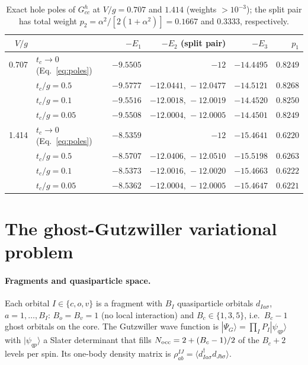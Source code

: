 \documentclass[11pt]{article}
\newcommand{\dg}{^{\dagger}}
\newcommand{\ket}[1]{|#1\rangle}
\newcommand{\braket}[1]{\langle #1\rangle}
\begin{document}
\begin{table}[h]
\centering
\small
\begin{tabular}{r l rrr r}
\toprule
$V/g$ & & $-E_1$ & $-E_2$ (split pair) & $-E_3$ & $p_1$\\
\midrule
0.707 & $t_c\to0$ (Eq.~\ref{eq:poles}) & $-9.5505$ & $-12$ & $-14.4495$ & $0.8249$\\
      & $t_c/g=0.5$  & $-9.5777$ & $-12.0441,\,-12.0477$ & $-14.5121$ & $0.8268$\\
      & $t_c/g=0.1$  & $-9.5516$ & $-12.0018,\,-12.0019$ & $-14.4520$ & $0.8250$\\
      & $t_c/g=0.05$ & $-9.5508$ & $-12.0004,\,-12.0005$ & $-14.4501$ & $0.8249$\\
\midrule
1.414 & $t_c\to0$ (Eq.~\ref{eq:poles}) & $-8.5359$ & $-12$ & $-15.4641$ & $0.6220$\\
      & $t_c/g=0.5$  & $-8.5707$ & $-12.0406,\,-12.0510$ & $-15.5198$ & $0.6263$\\
      & $t_c/g=0.1$  & $-8.5373$ & $-12.0016,\,-12.0020$ & $-15.4663$ & $0.6222$\\
      & $t_c/g=0.05$ & $-8.5362$ & $-12.0004,\,-12.0005$ & $-15.4647$ & $0.6221$\\
\bottomrule
\end{tabular}
\caption{Exact hole poles of $G^h_{cc}$ at $V/g=0.707$ and $1.414$ (weights $>10^{-3}$); the split pair has total weight $p_2=\alpha^2/[2(1+\alpha^2)]=0.1667$ and $0.3333$, respectively.}
\label{tab:EDpoles}
\end{table}

\section{The ghost-Gutzwiller variational problem}
\label{sec:gGut}

\paragraph{Fragments and quasiparticle space.} Each orbital $I\in\{c,o,v\}$ is a fragment with $B_I$ quasiparticle
orbitals $d_{Ia\sigma}$, $a=1,\dots,B_I$: $B_o=B_v=1$ (no local interaction) and $B_c\in\{1,3,5\}$, i.e.\ $B_c-1$ ghost orbitals on
the core. The Gutzwiller wave function is $\ket{\Psi_G}=\prod_IP_I\ket{\psi_{qp}}$ with $\ket{\psi_{qp}}$ a Slater determinant that fills
$N_{\rm occ}=2+(B_c-1)/2$ of the $B_c+2$ levels per spin. Its one-body density matrix is
$\rho^{IJ}_{ab}=\braket{d\dg_{Ia\sigma}d_{Jb\sigma}}$.
\end{document}
